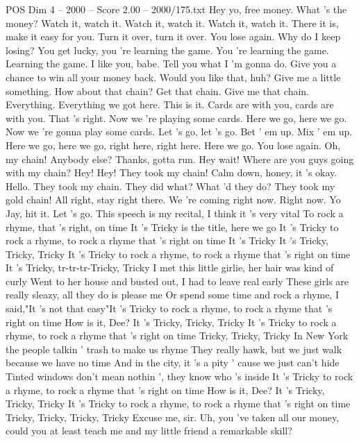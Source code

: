 \begin{textsample}{POS Dim 4 – 2000 – Score 2.00 – 2000/175.txt}  \label{ex:f4_pos_007}
Hey yo, free money.
What 's the money?
Watch it, watch it.
Watch it, watch it.
Watch it, watch it.
There it is, make it easy for you.
Turn it over, turn it over.
You lose again.
Why do I keep losing?
You get lucky, you 're learning the game.
You 're learning the game.
Learning the game.
I like you, babe.
Tell you what I 'm gonna do.
Give you a chance to win all your money back.
Would you like that, huh?
Give me a little something.
How about that chain?
Get that chain.
Give me that chain.
Everything.
Everything we got here.
This is it.
Cards are with you, cards are with you.
That 's right.
Now we 're playing some cards.
Here we go, here we go.
Now we 're gonna play some cards.
Let 's go, let 's go.
Bet ' em up.
Mix ' em up.
Here we go, here we go, right here, right here.
Here we go.
You lose again.
Oh, my chain!
Anybody else?
Thanks, gotta run.
Hey wait!
Where are you guys going with my chain?
Hey!
Hey!
They took my chain!
Calm down, honey, it 's okay.
Hello.
They took my chain.
They did what?
What 'd they do?
They took my gold chain!
All right, stay right there.
We 're coming right now.
Right now.
Yo Jay, hit it.
Let 's go.
This speech is my recital, I think it 's very vital To rock a rhyme, that 's right, on time It 's Tricky is the title, here we go It 's Tricky to rock a rhyme, to rock a rhyme that 's right on time It 's Tricky It 's Tricky, Tricky, Tricky It 's Tricky to rock a rhyme, to rock a rhyme that 's right on time It 's Tricky, tr-tr-tr-Tricky, Tricky I met this little girlie, her hair was kind of curly Went to her house and busted out, I had to leave real early These girls are really sleazy, all they do is please me Or spend some time and rock a rhyme, I said,"It 's not that easy"It 's Tricky to rock a rhyme, to rock a rhyme that 's right on time How is it, Dee?
It 's Tricky, Tricky, Tricky It 's Tricky to rock a rhyme, to rock a rhyme that 's right on time Tricky, Tricky, Tricky In New York the people talkin ' trash to make us rhyme They really hawk, but we just walk because we have no time And in the city, it 's a pity ' cause we just can't hide Tinted windows don't mean nothin ', they know who 's inside It 's Tricky to rock a rhyme, to rock a rhyme that 's right on time How is it, Dee?
It 's Tricky, Tricky, Tricky It 's Tricky to rock a rhyme, to rock a rhyme that 's right on time Tricky, Tricky, Tricky, Tricky Excuse me, sir.
Uh, you 've taken all our money, could you at least teach me and my little friend a remarkable skill?

\end{textsample}
